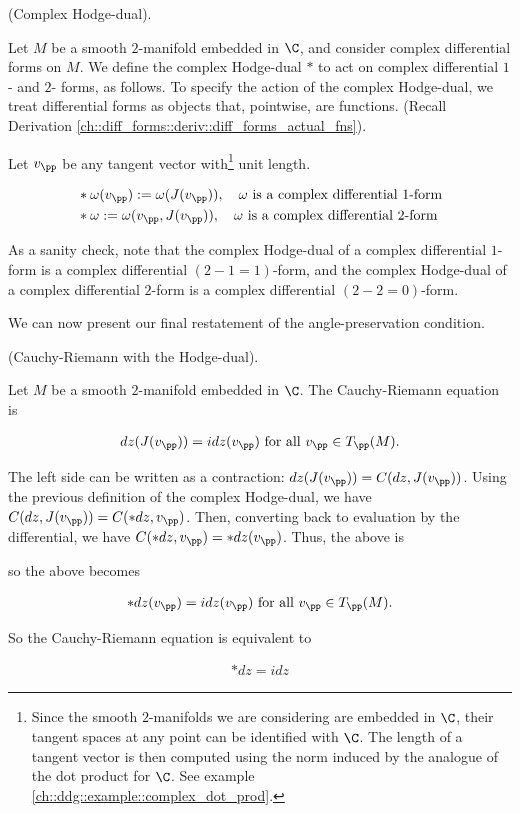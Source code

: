 \begin{defn}
    (Complex Hodge-dual).

    Let $M$ be a smooth $2$-manifold embedded in $\C$, and consider complex differential forms on $M$. We define the complex Hodge-dual $*$ to act on complex differential $1$- and $2$- forms, as follows. To specify the action of the complex Hodge-dual, we treat differential forms as objects that, pointwise, are functions. (Recall Derivation \ref{ch::diff_forms::deriv::diff_forms_actual_fns}).
    
    Let $v_\pp$ be any tangent vector with\footnote{Since the smooth $2$-manifolds we are considering are embedded in $\C$, their tangent spaces at any point can be identified with $\C$. The length of a tangent vector is then computed using the norm induced by the analogue of the dot product for $\C$. See example \ref{ch::ddg::example::complex_dot_prod}.} unit length.
    
    \begin{align*}
        &*\omega(v_\pp) := \omega(J(v_\pp)), \quad \text{$\omega$ is a complex differential $1$-form} \\
        &*\omega := \omega(v_\pp, J(v_\pp)), \quad \text{$\omega$ is a complex differential $2$-form}
    \end{align*}
    
    As a sanity check, note that the complex Hodge-dual of a complex differential $1$-form is a complex differential $(2 - 1 = 1)$-form, and the complex Hodge-dual of a complex differential $2$-form is a complex differential $(2 - 2 = 0)$-form.
\end{defn}

We can now present our final restatement of the angle-preservation condition.

\begin{theorem}
    (Cauchy-Riemann with the Hodge-dual).

     Let $M$ be a smooth $2$-manifold embedded in $\C$. The Cauchy-Riemann equation is
     
     \begin{align*}
        dz(J(v_\pp)) = idz(v_\pp) \text{ for all $v_\pp \in T_\pp(M)$}.
    \end{align*}
    
    The left side can be written as a contraction: $dz(J(v_\pp)) = C(dz, J(v_\pp))$. Using the previous definition of the complex Hodge-dual, we have $C(dz, J(v_\pp)) = C(*dz, v_\pp)$. Then, converting back to evaluation by the differential, we have $C(*dz, v_\pp) = *dz(v_\pp)$. Thus, the above is
    
    so the above becomes
    
    \begin{align*}
        *dz(v_\pp) = idz(v_\pp) \text{ for all $v_\pp \in T_\pp(M)$}.
    \end{align*}
    
    So the Cauchy-Riemann equation is equivalent to
    
    \begin{align*}
        \boxed
        {
            *dz = idz
        }
    \end{align*}
\end{theorem}

